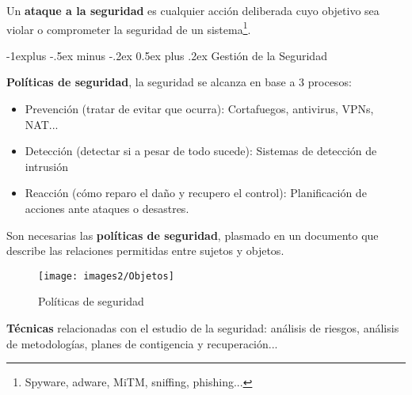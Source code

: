 \documentclass[10pt,portrait, twocolumn]{article}
\makeatletter
\renewcommand{\subsection}{\@startsection{subsection}{2}{0mm}%
                                {-1explus -.5ex minus -.2ex}%
                                {0.5ex plus .2ex}%
                                {\normalfont\normalsize\bfseries}}
\makeatother
\begin{document}
Un \textbf{ataque a la seguridad} es cualquier acción deliberada cuyo objetivo sea violar o comprometer la seguridad de un sistema\footnote{Spyware, adware, MiTM, sniffing, phishing...}.

\subsection{Gestión de la Seguridad}

\textbf{Políticas de seguridad}, la seguridad se alcanza en base a 3 procesos:

	\begin{itemize}
		\item Prevención (tratar de evitar que ocurra): Cortafuegos, antivirus, VPNs, NAT...
		\item Detección (detectar si a pesar de todo sucede): Sistemas de detección de intrusión
		\item Reacción (cómo reparo el daño y recupero el control): Planificación de acciones ante ataques o desastres.
	\end{itemize}
	
Son necesarias las \textbf{políticas de seguridad}, plasmado en un documento que describe las relaciones permitidas entre sujetos y objetos.

	\begin{figure}[ht!]
	\centering
	\texttt{[image: images2/Objetos]}
	\caption{Políticas de seguridad}
	\label{figure:Planta1}
	\end{figure}
	
\textbf{Técnicas} relacionadas con el estudio de la seguridad: análisis de riesgos, análisis de metodologías, planes de contigencia y recuperación...


\newpage
\end{document}
